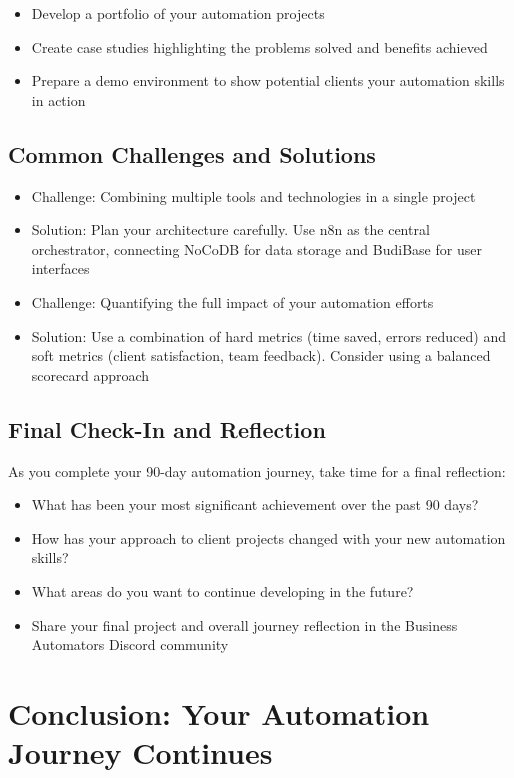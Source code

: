 \begin{itemize}
    \item Develop a portfolio of your automation projects
    \item Create case studies highlighting the problems solved and benefits achieved
    \item Prepare a demo environment to show potential clients your automation skills in action
\end{itemize}

\subsection{Common Challenges and Solutions}
\begin{itemize}
    \item Challenge: Combining multiple tools and technologies in a single project
    \item Solution: Plan your architecture carefully. Use n8n as the central orchestrator, connecting NoCoDB for data storage and BudiBase for user interfaces

    \item Challenge: Quantifying the full impact of your automation efforts
    \item Solution: Use a combination of hard metrics (time saved, errors reduced) and soft metrics (client satisfaction, team feedback). Consider using a balanced scorecard approach
\end{itemize}

\subsection{Final Check-In and Reflection}
As you complete your 90-day automation journey, take time for a final reflection:

\begin{itemize}
    \item What has been your most significant achievement over the past 90 days?
    \item How has your approach to client projects changed with your new automation skills?
    \item What areas do you want to continue developing in the future?
    \item Share your final project and overall journey reflection in the Business Automators Discord community
\end{itemize}

\section{Conclusion: Your Automation Journey Continues}

